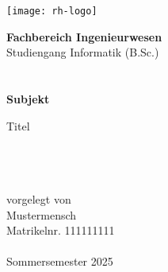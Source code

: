\begin{titlepage}
 
    \texttt{[image: rh-logo]}\\[2cm]
    
    \begin{minipage}{\textwidth}
    \hspace{3cm}\begin{minipage}{\dimexpr\textwidth-3cm\relax}
    {\Large\textbf{Fachbereich Ingenieurwesen}}\\
    
    {\Large Studiengang Informatik (B.Sc.)}\\
    \\
    \\
    
    
    {\Large\textbf{Subjekt}}\\
    
    \parbox{\textwidth}{\Large\raggedright Titel}\\
    \\
    \\
    
    {\normalsize\fontsize{11pt}{16.5pt}\selectfont vorgelegt von}\\
    
    {\Large Mustermensch}\\
    
    {\normalsize\fontsize{11pt}{16.5pt}\selectfont Matrikelnr. 111111111}\\
    \\
    
    {\normalsize Sommersemester 2025}
    \end{minipage}
    \end{minipage}
    
    \vfill
    
\end{titlepage}
